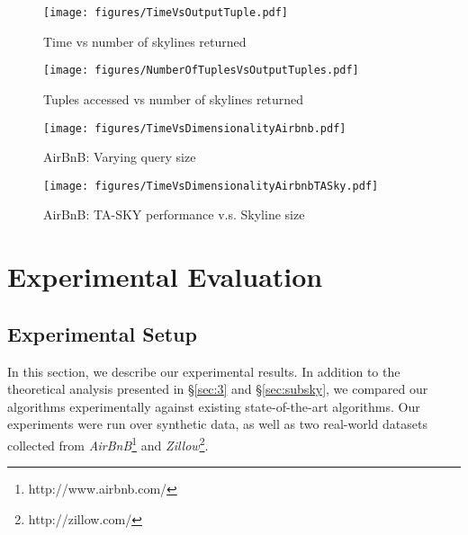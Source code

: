 \begin{figure*}[!ht]
  \vspace{-6mm}
  \begin{minipage}[t]{0.25\linewidth}
    \centering
    \texttt{[image: figures/TimeVsOutputTuple.pdf]}
    \caption{Time vs number of skylines returned}
    \label{fig:syn_TimeVsNumberOfSkylines}
  \end{minipage}
  \hspace{2mm}
  \begin{minipage}[t]{0.25\linewidth}
    \centering
    \texttt{[image: figures/NumberOfTuplesVsOutputTuples.pdf]}
    \caption{Tuples accessed vs number of skylines returned}
    \label{fig:syn_NumberOfTuplesVsSkylines}
  \end{minipage}
  \begin{minipage}[t]{0.21\linewidth}
    \centering
    \texttt{[image: figures/TimeVsDimensionalityAirbnb.pdf]}
    \caption{AirBnB: Varying query size}
    \label{fig:algorithmsAirbnb}
  \end{minipage}
  \hspace{1mm}
  \begin{minipage}[t]{0.23\linewidth}
    \centering
    \texttt{[image: figures/TimeVsDimensionalityAirbnbTASky.pdf]}
    \caption{AirBnB: TA-SKY performance v.s. Skyline size}
    \label{fig:Airbnbm}
  \end{minipage}
\end{figure*}

\section{Experimental Evaluation}\label{sec:experiments}
\subsection{Experimental Setup}

In this section, we describe our experimental results. In addition to the theoretical analysis presented in \S\ref{sec:3} and \S\ref{sec:subsky}, we compared our algorithms experimentally against existing state-of-the-art algorithms.  Our experiments were run over synthetic data, as well as two real-world datasets collected from \emph{AirBnB}\footnote{\small{http://www.airbnb.com/}} and \emph{Zillow}\footnote{\small{http://zillow.com/}}.

